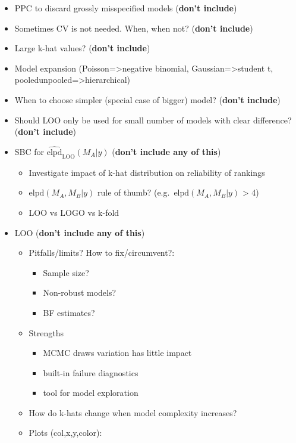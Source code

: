 \begin{itemize}
\tightlist
\item
  PPC to discard grossly misspecified models (\textbf{don't include})
\item
  Sometimes CV is not needed. When, when not? (\textbf{don't include})
\item
  Large k-hat values? (\textbf{don't include})
\item
  Model expansion (Poisson=\textgreater{}negative binomial,
  Gaussian=\textgreater{}student t,
  pooled\textbar{}unpooled=\textgreater{}hierarchical)
\item
  When to choose simpler (special case of bigger) model? (\textbf{don't
  include})
\item
  Should LOO only be used for small number of models with clear
  difference? (\textbf{don't include})
\item
  SBC for \(\widehat{\mathrm{elpd}}_\mathrm{LOO}(M_A | y)\)
  (\textbf{don't include any of this})

  \begin{itemize}
  \tightlist
  \item
    Investigate impact of k-hat distribution on reliability of rankings
  \item
    \(\mathrm{elpd}(M_A, M_B | y)\) rule of thumb?
    (e.g.~\(\mathrm{elpd}(M_A, M_B | y)\) \textgreater{} 4)
  \item
    LOO vs LOGO vs k-fold
  \end{itemize}
\item
  LOO (\textbf{don't include any of this})

  \begin{itemize}
  \tightlist
  \item
    Pitfalls/limits? How to fix/circumvent?:

    \begin{itemize}
    \tightlist
    \item
      Sample size?\\
    \item
      Non-robust models?
    \item
      BF estimates?
    \end{itemize}
  \item
    Strengths

    \begin{itemize}
    \tightlist
    \item
      MCMC draws variation has little impact
    \item
      built-in failure diagnostics
    \item
      tool for model exploration
    \end{itemize}
  \item
    How do k-hats change when model complexity increases?
  \item
    Plots (col,x,y,color):


\end{itemize}
\end{itemize}
